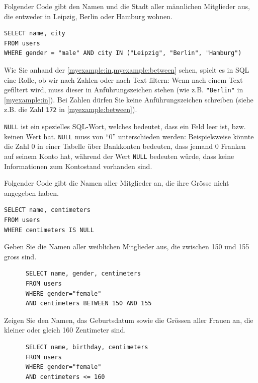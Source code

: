 \begin{myexample}\label{myexample:in}
Folgender Code gibt den Namen und die Stadt aller männlichen Mitglieder aus, die entweder in Leipzig, Berlin oder Hamburg wohnen.

\begin{lstlisting}
SELECT name, city
FROM users 
WHERE gender = "male" AND city IN ("Leipzig", "Berlin", "Hamburg")
\end{lstlisting}
\end{myexample}


\begin{mycaution}
Wie Sie anhand der \cref{myexample:in,myexample:between} sehen, spielt es in SQL eine Rolle, ob  wir nach Zahlen oder nach
  Text filtern: Wenn nach einem Text gefiltert wird, muss dieser in Anführungszeichen stehen (wie z.B.
  \lstinline|"Berlin"| in \cref{myexample:in}). Bei Zahlen dürfen Sie keine Anführungszeichen schreiben (siehe z.B. die Zahl
  \lstinline|172| in \cref{myexample:between}).
\end{mycaution}

\lstinline|NULL| ist ein spezielles \gls{SQL}-Wort, welches bedeutet, dass ein Feld leer ist, bzw. keinen
Wert hat. \lstinline|NULL| muss von \enquote{0} unterschieden werden: Beispielsweise könnte die Zahl 0 in einer 
Tabelle über Bankkonten bedeuten, dass jemand 0 Franken auf seinem Konto hat, während der Wert \lstinline|NULL| bedeuten würde, dass keine 
Informationen zum Kontostand vorhanden sind.

\begin{myexample}
  Folgender Code gibt die Namen aller Mitglieder an, die ihre Grösse nicht angegeben haben.
\begin{lstlisting}
SELECT name, centimeters
FROM users 
WHERE centimeters IS NULL
\end{lstlisting}
\end{myexample}


\begin{myexercise}
  Geben Sie die Namen aller weiblichen Mitglieder aus, die zwischen 150 und 155 gross sind.
  \begin{myanswer}
    \begin{lstlisting}
      SELECT name, gender, centimeters
      FROM users
      WHERE gender="female"
      AND centimeters BETWEEN 150 AND 155
    \end{lstlisting}
  \end{myanswer}
\end{myexercise}
\begin{myexercise}
  Zeigen Sie den Namen, das Geburtsdatum sowie die Grössen aller Frauen an, die kleiner oder gleich 160 Zentimeter sind.
  \begin{myanswer}
    \begin{lstlisting}
      SELECT name, birthday, centimeters
      FROM users
      WHERE gender="female"
      AND centimeters <= 160
    \end{lstlisting}
  \end{myanswer}
\end{myexercise}

